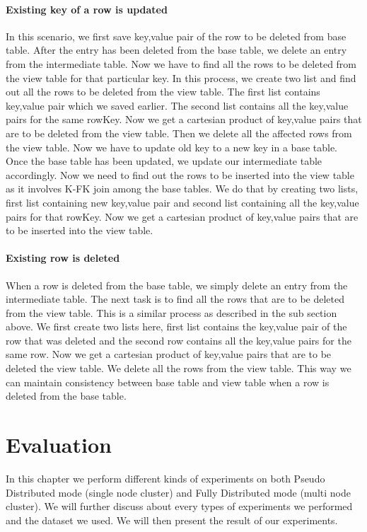 \documentclass[11pt,a4paper,bibtotoc,idxtotoc,headsepline,footsepline,footexclude,BCOR12mm,DIV13]{scrbook}
\begin{document}
\subsubsection{Existing key of a row is updated}
In this scenario, we first save key,value pair of the row to be deleted from base table. After the entry has been deleted from the base table, we delete an entry from the intermediate table. Now we have to find all the rows to be deleted from the view table for that particular key. In this process, we create two list and find out all the rows to be deleted from the view table. The first list contains key,value pair which we saved earlier. The second list contains all the key,value pairs for the same rowKey. Now we get a cartesian product of key,value pairs that are to be deleted from the view table. Then we delete all the affected rows from the view table. Now we have to update old key to a new key in a base table. Once the base table has been updated, we update our intermediate table accordingly. Now we need to find out the rows to be inserted into the view table as it involves K-FK join among the base tables. We do that by creating two lists, first list containing new key,value pair and second list containing all the key,value pairs for that rowKey. Now we get a cartesian product of key,value pairs that are to be inserted into the view table.

\subsubsection{Existing row is deleted}
When a row is deleted from the base table, we simply delete an entry from the intermediate table. The next task is to find all the rows that are to be deleted from the view table. This is a similar process as described in the sub section above. We first create two lists here, first list contains the key,value pair of the row that was deleted and the second row contains all the key,value pairs for the same row. Now we get a cartesian product of key,value pairs that are to be deleted the view table. We delete all the rows from the view table. This way we can maintain consistency between base table and view table when a row is deleted from the base table.

\newpage
\chapter{Evaluation}
\label{Evaluation}
In this chapter we perform different kinds of experiments on both Pseudo Distributed mode (single node cluster) and Fully Distributed mode (multi node cluster). We will further discuss about every types of experiments we performed and the dataset we used. We will then present the result of our experiments.
\end{document}

